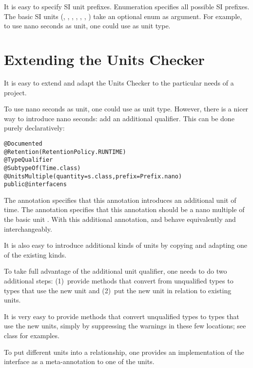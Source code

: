 It is easy to specify SI unit prefixes.
Enumeration  specifies all possible SI prefixes.
The basic SI units
(, , , , ,
 , )
take an optional  enum as argument.
For example, to use nano seconds as unit, one could use
 as unit type.



\section{Extending the Units Checker}

It is easy to extend and adapt the Units Checker to the particular
needs of a project.


To use nano seconds as unit, one could use
 as unit type.
However, there is a nicer way to introduce nano seconds: add an
additional qualifier.
This can be done purely declaratively:

\begin{alltt}
@Documented
@Retention(RetentionPolicy.RUNTIME)
@TypeQualifier
@SubtypeOf( \ttlcb{} Time.class \ttrcb{} )
@UnitsMultiple(quantity=s.class, prefix=Prefix.nano)
public @interface ns \ttlcb{}\ttrcb{}
\end{alltt}

The  annotation specifies that this annotation
introduces an additional unit of time.
The  annotation specifies that this annotation
should be a nano multiple of the basic unit .
With this additional annotation,  and
behave equivalently and interchangeably.


It is also easy to introduce additional kinds of units by copying and
adapting one of the existing kinds.

To take full advantage of the additional unit qualifier, one needs to
do two additional steps:
(1)~provide methods that convert from unqualified types to types that use
the new unit and
(2)~put the new unit in relation to existing units.


It is very easy to provide methods that convert
unqualified types to types that use the new units,
simply by suppressing the warnings in these few locations;
see class  for examples.


To put different units into a relationship, one provides an
implementation of the  interface as a
meta-annotation to one of the units.

